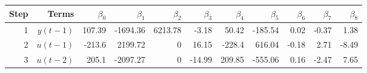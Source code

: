\begin{tabular}{rrrrrrrrrrr}
Step & Terms & $\beta_{0}$ & $\beta_{1}$ & $\beta_{2}$ & $\beta_{3}$ & $\beta_{4}$ & $\beta_{5}$ & $\beta_{6}$ & $\beta_{7}$ & $\beta_{8}$ \\ 
\hline 
1 & $y(t-1)$ & 107.39 & -1694.36 & 6213.78 & -3.18 & 50.42 & -185.54 & 0.02 & -0.37 & 1.38 \\ 
2 & $u(t-1)$ & -213.6 & 2199.72 & 0 & 16.15 & -228.4 & 616.04 & -0.18 & 2.71 & -8.49 \\ 
3 & $u(t-2)$ & 205.1 & -2097.27 & 0 & -14.99 & 209.85 & -555.06 & 0.16 & -2.47 & 7.65 \\ 
\hline 
\end{tabular}